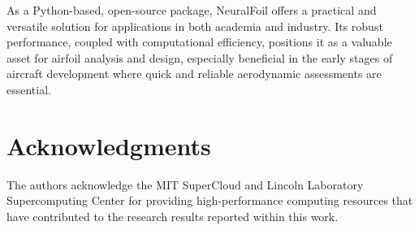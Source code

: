 \documentclass[conf]{new-aiaa}
\begin{document}
    As a Python-based, open-source package, NeuralFoil offers a practical and versatile solution for applications in both academia and industry. Its robust performance, coupled with computational efficiency, positions it as a valuable asset for airfoil analysis and design, especially beneficial in the early stages of aircraft development where quick and reliable aerodynamic assessments are essential.

    \section*{Acknowledgments}
    The authors acknowledge the MIT SuperCloud and Lincoln Laboratory Supercomputing Center for providing high-performance computing resources that have contributed to the research results reported within this work.

    
\end{document}
